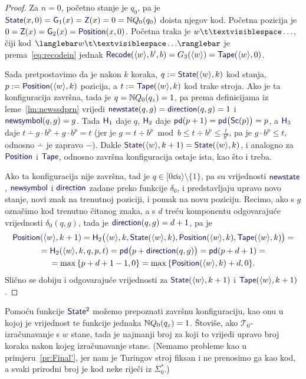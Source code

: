 \begin{proof}
Za $n=0$, početno stanje je $q_0$, pa je $\f{State}(x,0)=\f G_1(x)=\f Z(x)=0=\N Q_0(q_0)$ doista njegov kod. Početna pozicija je $0=\f Z(x)=\f G_2(x)=\f{Position}(x,0)$. Početna traka je $w\bl\ldots$, čiji kod $\knk{w\bl\ldots}$ je prema~\eqref{eq:recodein} jednak $\f{Recode}(\kr w,b',b)=G_3(\kr w)=\f{Tape}(\kr w,0)$.

Sada pretpostavimo da je nakon $k$ koraka, $q:=\f{State}(\kr w,k)$ kod stanja, $p:=\f{Position}(\kr w,k)$ pozicija, a $t:=\f{Tape}(\kr w,k)$ kod trake stroja. Ako je ta konfiguracija završna, tada je $q={\mathbb N} Q_0(q_z)=1$, pa prema definicijama iz leme~\ref{lm:newssdprn} vrijedi $\f{newstate}(q,g)=\f{direction}(q,g)=1$ i $\f{newsymbol}(q,g)=g$. Tada $\f H_1$ daje $q$, $\f H_2$ daje $\f{pd}(p+1)=\f{pd}\bigl(\f{Sc}(p)\bigr)=p$, a $\f H_3$ daje $t\dotminus g\cdot b^p+g\cdot b^p=t$ (jer je $g=t\div b^p\bmod b\le t\div b^p\le\frac{t}{b^p}$, pa je $g\cdot b^p\le t$, odnosno $\dotminus$ je zapravo $-$). Dakle $\f{State}(\kr w,k+1)=\f{State}(\kr w,k)$, i analogno za $\f{Position}$ i $\f{Tape}$, odnosno završna konfiguracija ostaje ista, kao što i treba.

Ako ta konfiguracija nije završna, tad je $q\in[0\dd a\rangle\setminus\{1\}$, pa su vrijednosti $\f{newstate}$, $\f{newsymbol}$ i $\f{direction}$ zadane preko funkcije $\delta_0$, i predstavljaju upravo novo stanje, novi znak na trenutnoj poziciji, i pomak na novu poziciju. Recimo, ako s $g$ označimo kod trenutno čitanog znaka, a s $d$ treću komponentu odgovarajuće vrijednosti $\delta_0(q,g)$, tada je $\f{direction}(q,g)=d+1$, pa je
\begin{multline}
    \f{Position}(\kr w,k+1)=\f H_2\bigl(\kr w,k,\f{State}(\kr w,k),\f{Position}(\kr w, k),\f{Tape}(\kr w,k)\bigr)=\\
    =\f H_2(\kr w,k,q,p,t)=
    \f{pd}\bigl(p+\f{direction}(q,g)\bigr)=\f{pd}(p+d+1)=\\
    =\max\,\{p+d+1-1,0\}=\max\,\{\f{Position}(\kr w,k)+d,0\}\text.
\end{multline}
Slično se dobiju i odgovarajuće vrijednosti za $\f{State}(\kr w,k+1)$ i $\f{Tape}(\kr w,k+1)$.
\end{proof}


Pomoću funkcije $\f{State}^2$ možemo prepoznati završnu konfiguraciju, kao onu u kojoj je vrijednost te funkcije jednaka ${\mathbb N} Q_0(q_z)=1$. Štoviše, ako $\mathcal T_0$-izračunavanje s $w$ stane, tada je najmanji broj za koji to vrijedi upravo broj koraka nakon kojeg izračunavanje stane. (Nemamo probleme kao u primjeru~\ref{pr:Final'}, jer nam je Turingov stroj fiksan i ne prenosimo ga kao kod, a svaki prirodni broj je kod neke riječi iz $\Sigma_0^*$.)

